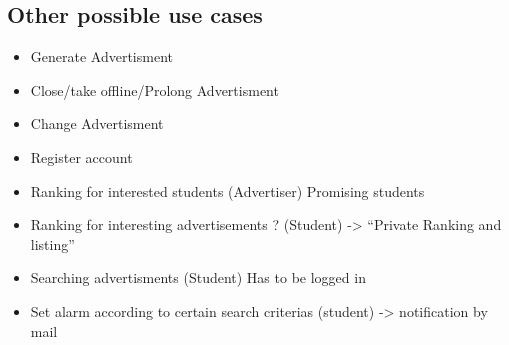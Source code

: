\documentclass[a4paper,11pt]{article}
\begin{document}
\begin{itemize}
\subsection*{Other possible use cases}
\begin{itemize}
  \item Generate Advertisment
  \item Close/take offline/Prolong Advertisment
  \item Change Advertisment
  \item Register account
  \item Ranking for interested students (Advertiser) Promising students
  \item Ranking for interesting advertisements ? (Student) -> “Private Ranking and listing”
  \item Searching advertisments (Student) Has to be logged in
  \item Set alarm according to certain search criterias (student) -> notification by mail
\end{itemize}
\end{itemize}
\end{document}
